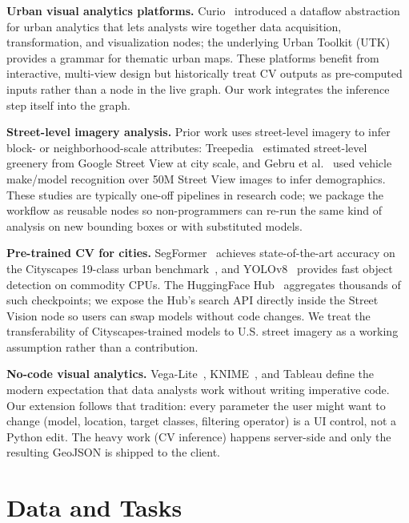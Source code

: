 \documentclass[journal]{vgtc}                     %
\begin{document}
\textbf{Urban visual analytics platforms.} Curio~\cite{Moreira2024CurioDataflowFramework} introduced a dataflow abstraction for urban analytics that lets analysts wire together data acquisition, transformation, and visualization nodes; the underlying Urban Toolkit (UTK)~\cite{Moreira2023UrbanToolkitGrammar} provides a grammar for thematic urban maps. These platforms benefit from interactive, multi-view design but historically treat CV outputs as pre-computed inputs rather than a node in the live graph. Our work integrates the inference step itself into the graph.

\textbf{Street-level imagery analysis.} Prior work uses street-level imagery to infer block- or neighborhood-scale attributes: Treepedia~\cite{Li2015AssessingStreetlevelUrban} estimated street-level greenery from Google Street View at city scale, and Gebru et al.~\cite{Gebru2017UsingDeepLearning} used vehicle make/model recognition over 50M Street View images to infer demographics. These studies are typically one-off pipelines in research code; we package the workflow as reusable nodes so non-programmers can re-run the same kind of analysis on new bounding boxes or with substituted models.

\textbf{Pre-trained CV for cities.} SegFormer~\cite{Xie2021SegFormerSimpleEfficient} achieves state-of-the-art accuracy on the Cityscapes 19-class urban benchmark~\cite{Cordts2016CityscapesDatasetSemantic}, and YOLOv8~\cite{Jocher2023YOLOv8} provides fast object detection on commodity CPUs. The HuggingFace Hub~\cite{Wolf2020TransformersStateoftheartNatural} aggregates thousands of such checkpoints; we expose the Hub's search API directly inside the Street Vision node so users can swap models without code changes. We treat the transferability of Cityscapes-trained models to U.S. street imagery as a working assumption rather than a contribution.

\textbf{No-code visual analytics.} Vega-Lite~\cite{Satyanarayan2017VegaLiteGrammarInteractive}, KNIME~\cite{Berthold2009KNIMEKonstanzInformation}, and Tableau define the modern expectation that data analysts work without writing imperative code. Our extension follows that tradition: every parameter the user might want to change (model, location, target classes, filtering operator) is a UI control, not a Python edit. The heavy work (CV inference) happens server-side and only the resulting GeoJSON is shipped to the client.

\section{Data and Tasks}
\label{sec:data}
\end{document}
